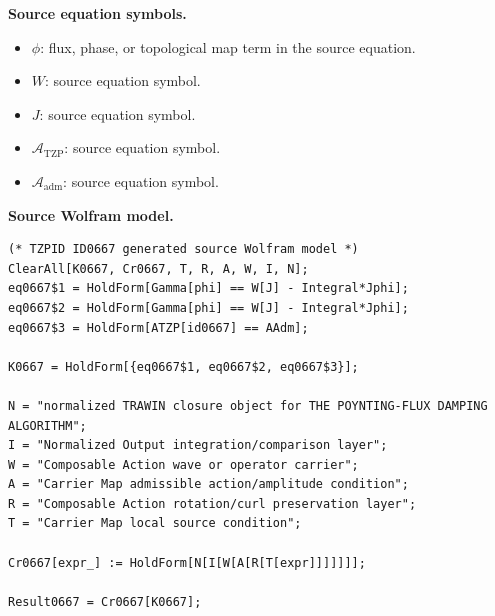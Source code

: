 \begin{minipage}[t]{0.49\linewidth}
\begingroup
\small
\raggedright
\textbf{Source equation symbols.}\par
\begin{itemize}[leftmargin=1.35em,itemsep=1pt,topsep=1pt,parsep=0pt]
    \item $\phi$: flux, phase, or topological map term in the source equation.
    \item $W$: source equation symbol.
    \item $J$: source equation symbol.
    \item $\mathcal{A}_{\mathrm{TZP}}$: source equation symbol.
    \item $\mathcal{A}_{\mathrm{adm}}$: source equation symbol.
\end{itemize}
\endgroup
\end{minipage}\hfill
\begin{minipage}[t]{0.47\linewidth}
\begingroup
\scriptsize
\raggedright
\textbf{Source Wolfram model.}\par
\begin{Verbatim}[fontsize=\tiny,breaklines=true,breakanywhere=true]
(* TZPID ID0667 generated source Wolfram model *)
ClearAll[K0667, Cr0667, T, R, A, W, I, N];
eq0667$1 = HoldForm[Gamma[phi] == W[J] - Integral*Jphi];
eq0667$2 = HoldForm[Gamma[phi] == W[J] - Integral*Jphi];
eq0667$3 = HoldForm[ATZP[id0667] == AAdm];

K0667 = HoldForm[{eq0667$1, eq0667$2, eq0667$3}];

N = "normalized TRAWIN closure object for THE POYNTING-FLUX DAMPING ALGORITHM";
I = "Normalized Output integration/comparison layer";
W = "Composable Action wave or operator carrier";
A = "Carrier Map admissible action/amplitude condition";
R = "Composable Action rotation/curl preservation layer";
T = "Carrier Map local source condition";

Cr0667[expr_] := HoldForm[N[I[W[A[R[T[expr]]]]]]];

Result0667 = Cr0667[K0667];
\end{Verbatim}
\endgroup
\end{minipage}

